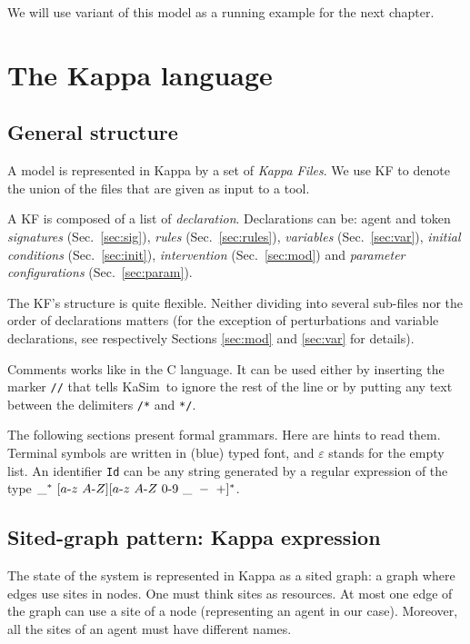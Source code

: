 \documentclass[11pt]{book}
\def\KaSim{\textsf{KaSim}}
\def\sep{\hbox{-}}
\def\ttt#1{\texttt{#1}}
\begin{document}
We will use variant of this model as a running example for the next chapter.

\chapter{The Kappa language}\label{chap:kappa}

\section{General structure}
A model is represented in Kappa by a set of \emph{Kappa Files}. We use
KF to denote the union of the files that are given
as input to a tool.

A KF is composed of a list of
\emph{declaration}.
Declarations can be: agent and token \emph{signatures}
(Sec.~\ref{sec:sig}), \emph{rules} (Sec.~\ref{sec:rules}),
\emph{variables} (Sec.~\ref{sec:var}), \emph{initial
  conditions} (Sec.~\ref{sec:init}),
\emph{intervention} (Sec.~\ref{sec:mod}) and
\emph{parameter configurations} (Sec.~\ref{sec:param}).

The KF's structure is quite flexible. Neither
dividing into several sub-files nor the order of
declarations matters (for the exception of
perturbations and variable declarations, see
respectively Sections \ref{sec:mod} and \ref{sec:var} for details).

Comments works like in the C language. It can be used
either by inserting the marker \ttt{//} that tells \KaSim~to ignore
the rest of the line or by putting any text between the delimiters
\ttt{/*} and \ttt{*/}.

The following sections present formal grammars. Here are hints to read
them.  Terminal symbols are written in (blue) typed font, and
$\varepsilon$ stands for the empty list. An identifier \ttt{Id} can be
any string generated by a regular expression of the type $\_^*\ [
  a\sep z\ A\sep Z][a\sep z\ A \sep Z\ 0\sep 9\ \_ \ -\ +]^*$.

\section{Sited-graph pattern: Kappa expression}

The state of the system is represented in Kappa as a sited graph: a
graph where edges use sites in nodes. One must think sites as
resources. At most one edge of the graph can use a site of a node
(representing an agent in our case). Moreover, all the sites of an
agent must have different names.
\end{document}
